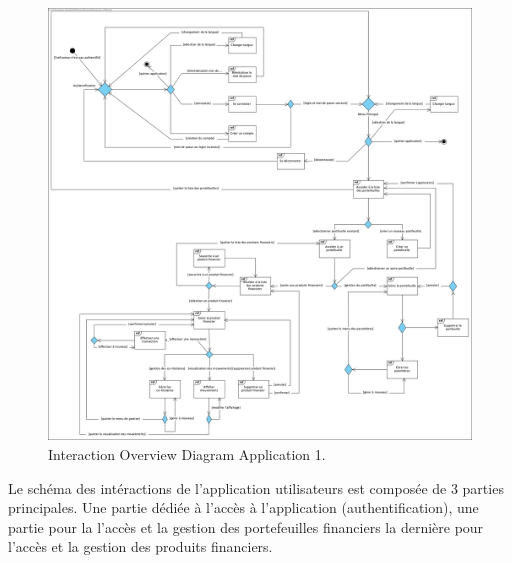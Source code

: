 \documentclass[../rapport.tex]{subfiles}
\begin{document}
\begin{figure}[h!]
		\centering \includegraphics[scale=0.20]{ressources/photos_diagrammes/app1/int_over_app1.jpg}
		\caption{Interaction Overview Diagram Application 1.}
\end{figure}

Le schéma des intéractions de l'application utilisateurs est composée de 3 parties principales. Une partie dédiée à l'accès à l'application (authentification), une partie pour la l'accès et la gestion des portefeuilles financiers la dernière pour l'accès et la gestion des produits financiers.\\
\newpage
\end{document}
